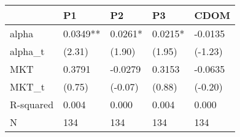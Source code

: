 \begin{tabular}{lllll}
\toprule
 & P1 & P2 & P3 & CDOM \\
\midrule
alpha & 0.0349** & 0.0261* & 0.0215* & -0.0135 \\
alpha_t & (2.31) & (1.90) & (1.95) & (-1.23) \\
MKT & 0.3791 & -0.0279 & 0.3153 & -0.0635 \\
MKT_t & (0.75) & (-0.07) & (0.88) & (-0.20) \\
R-squared & 0.004 & 0.000 & 0.004 & 0.000 \\
N & 134 & 134 & 134 & 134 \\
\bottomrule
\end{tabular}
